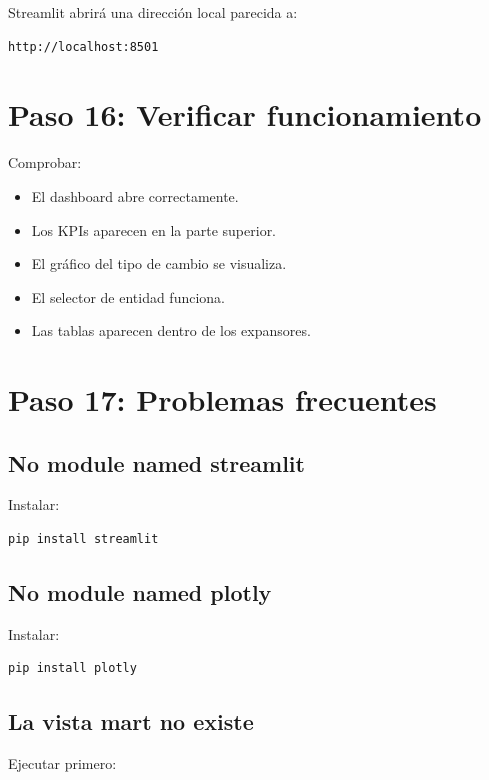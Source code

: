 Streamlit abrirá una dirección local parecida a:

\begin{verbatim}
http://localhost:8501
\end{verbatim}

\section{Paso 16: Verificar funcionamiento}

Comprobar:

\begin{itemize}
\item El dashboard abre correctamente.
\item Los KPIs aparecen en la parte superior.
\item El gráfico del tipo de cambio se visualiza.
\item El selector de entidad funciona.
\item Las tablas aparecen dentro de los expansores.
\end{itemize}

\section{Paso 17: Problemas frecuentes}

\subsection{No module named streamlit}

Instalar:

\begin{lstlisting}[language=bash]
pip install streamlit
\end{lstlisting}

\subsection{No module named plotly}

Instalar:

\begin{lstlisting}[language=bash]
pip install plotly
\end{lstlisting}

\subsection{La vista mart no existe}

Ejecutar primero:

